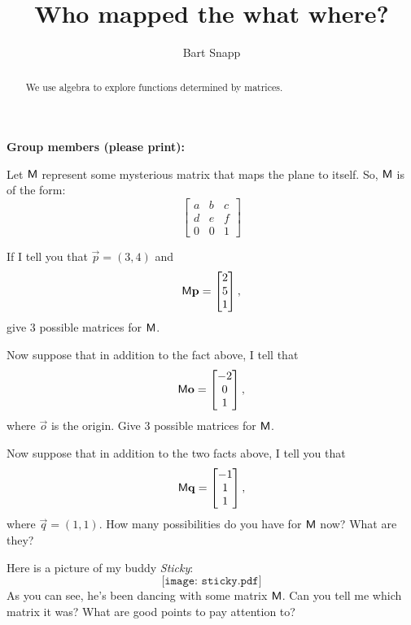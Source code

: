 \documentclass[noauthor,nooutcomes]{ximera}
\author{Bart Snapp}
\title{Who mapped the what where?}
\begin{document}
\begin{abstract}
We use algebra to explore functions determined by matrices.
\end{abstract}
\maketitle

\noindent\textbf{Group members (please print):}\ \hrulefill \\

\hrulefill

Let $\mathsf{M}$ represent some mysterious matrix that maps the plane to itself.
So, $\mathsf{M}$ is of the form:
\[
\begin{bmatrix}
a & b & c \\
d & e & f \\
0 & 0 & 1
\end{bmatrix}
\]

\begin{problem} 
If I tell you that $\vec{p} = (3,4)$ and 
\[
\mathsf{M}\mathbf{p} = \begin{bmatrix}2\\ 5\\ 1\end{bmatrix},
\]
give $3$ possible matrices for $\mathsf{M}$.
\end{problem}

\begin{problem} 
Now suppose that in addition to the fact above, I tell that
\[
\mathsf{M}\mathbf{o} = \begin{bmatrix}-2\\ 0\\ 1\end{bmatrix},
\]
where $\vec{o}$ is the origin.  Give $3$ possible matrices for
$\mathsf{M}$.
\end{problem}


\begin{problem} 
Now suppose that in addition to the two facts above, I tell you that 
\[
\mathsf{M}\mathbf{q} = \begin{bmatrix}-1\\ 1\\ 1\end{bmatrix},
\]
where $\vec{q} = (1,1)$.  How many possibilities do you have for
$\mathsf{M}$ now? What are they?
\end{problem}

\begin{problem}
Here is a picture of my buddy \textit{Sticky}:
\[
\texttt{[image: sticky.pdf]}
\]
As you can see, he's been dancing with some matrix $\mathsf{M}$. Can you
tell me which matrix it was? What are good points to pay attention to?
\end{problem}
\end{document}

